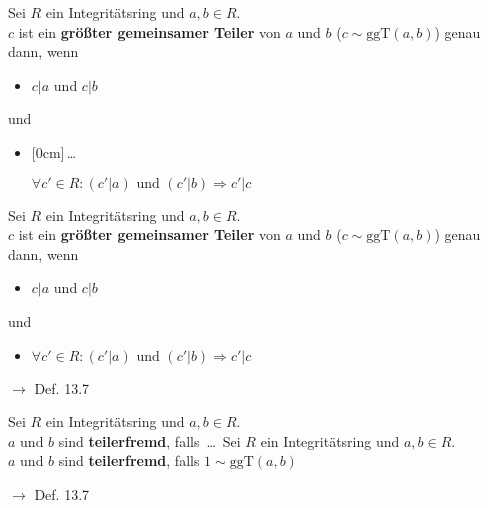 \documentclass[11pt]{article}
\renewcommand{\cite}[1]{\par\bigskip\hfill{\color{gray}\tiny\(\to\) #1}}
\newcommand{\hide}[1]{\parbox{0cm}{\raisebox{-7pt}[0cm]{\dots}}\color{white}#1\color{black}}
\let\olddots\dots
\renewcommand{\dots}{\,\olddots\,}
\newenvironment{field}{}{\newpage}
\newif\ifnote
\newenvironment{note}{\notetrue}{\notefalse}
\begin{document}
\begin{note}
    \begin{field}
        Sei $R$ ein Integritätsring und $a,b\in R$.\\
        $c$ ist ein \textbf{größter gemeinsamer Teiler} von $a$ und $b$ ($c \sim \text{ggT}(a,b)$) genau dann, wenn
        \begin{itemize}
            \item $c\vert a$ und $c\vert b$
        \end{itemize}
        und
        \begin{itemize}
            \item \hide{$\forall c'\in R\colon (c'\vert a) \text{ und } (c'\vert b) \Rightarrow c'\vert c$}
        \end{itemize}
    \end{field}
    \begin{field}
        Sei $R$ ein Integritätsring und $a,b\in R$.\\
        $c$ ist ein \textbf{größter gemeinsamer Teiler} von $a$ und $b$ ($c \sim \text{ggT}(a,b)$) genau dann, wenn
        \begin{itemize}
            \item $c\vert a$ und $c\vert b$
        \end{itemize}
        und
        \begin{itemize}
            \item $\forall c'\in R\colon (c'\vert a) \text{ und } (c'\vert b) \Rightarrow c'\vert c$
        \end{itemize}
        \cite{Def. 13.7}
    \end{field}

    \begin{field}
        Sei $R$ ein Integritätsring und $a,b\in R$.\\
        $a$ und $b$ sind \textbf{teilerfremd}, falls \dots
    \end{field}
    \begin{field}
        Sei $R$ ein Integritätsring und $a,b\in R$.\\
        $a$ und $b$ sind \textbf{teilerfremd}, falls $1\sim \text{ggT}(a,b)$
        \cite{Def. 13.7}
    \end{field}
\end{note}
\end{document}

